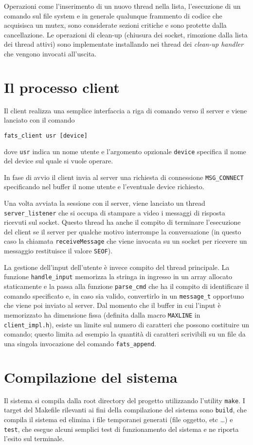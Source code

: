\documentclass[11pt,oneside,a4paper]{article}
\begin{document}
Operazioni come l'inserimento di un nuovo thread nella lista, l'esecuzione di un comando sul file system e in generale qualunque frammento di codice che acquisisca un mutex, sono considerate sezioni critiche e sono protette dalla cancellazione. Le operazioni di clean-up (chiusura dei socket, rimozione dalla lista dei thread attivi) sono implementate installando nei thread dei \emph{clean-up handler} che vengono invocati all'uscita.

\section{Il processo client}
\label{sec:client}
Il client realizza una semplice interfaccia a riga di comando verso il server e viene lanciato con il comando
\begin{center}
\texttt{fats\_client usr [device]}
\end{center}
dove \texttt{usr} indica un nome utente e l'argomento opzionale \texttt{device} specifica il nome del device sul quale si vuole operare.

In fase di avvio il client invia al server una richiesta di connessione \texttt{MSG\_CONNECT} specificando nel
buffer il nome utente e l'eventuale device richiesto.

Una volta avviata la sessione con il server, viene lanciato un thread \texttt{server\_listener} che si occupa di stampare a video i messaggi di risposta ricevuti sul socket. Questo thread ha anche il compito di terminare l'esecuzione del client se il server per qualche motivo interrompe la conversazione (in questo caso la chiamata \texttt{receiveMessage} che viene invocata su un socket per ricevere un messaggio restituisce il valore \texttt{SEOF}).

La gestione dell'input dell'utente è invece compito del thread principale. La funzione \texttt{handle\_input} memorizza la stringa in ingresso in un array allocato staticamente e la passa alla funzione \texttt{parse\_cmd} che ha il compito di identificare il comando specificato e, in caso sia valido, convertirlo in un \texttt{message\_t} opportuno che viene poi inviato al server. Dal momento che il buffer in cui l'input è memorizzato ha dimensione fissa (definita dalla macro \texttt{MAXLINE} in \texttt{client\_impl.h}), esiste un limite sul numero di caratteri che possono costituire un comando; questo limita ad esempio la quantità di caratteri scrivibili su un file da una singola invocazione del comando \texttt{fats\_append}.

\section{Compilazione del sistema}
\label{sec:comp}
Il sistema si compila dalla root directory del progetto utilizzando l'utility \texttt{make}. I target del Makefile rilevanti ai fini della compilazione del sistema sono \texttt{build}, che compila il sistema ed elimina i file temporanei generati (file oggetto, etc \ldots) e \texttt{test}, che esegue alcuni semplici test di funzionamento del sistema e ne riporta l'esito sul terminale.
\end{document}

